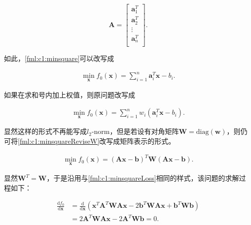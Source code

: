 \begin{equation}\label{fml:c1:reviseA}
	\mathbf{A} = \left[
	\begin{array}{c}
		 \mathbf{a}^T_1 \\
		 \mathbf{a}^T_2 \\
		 \vdots \\
		 \mathbf{a}^T_n \\
	\end{array}
	\right].
\end{equation}

如此，\eqref{fml:c1:minsquare}可以改写成

\begin{align} \label{fml:c1:minsquareRevise}
	\min\limits_{\mathbf{x}} f_0(\mathbf{x}) = \sum\limits_{i=1}^{n}{ \mathbf{a}^T_i \mathbf{x} - b_i }.
\end{align}

如果在求和号内加上权值，则原问题改写成

\begin{align} \label{fml:c1:minsquareReviseW}
	\min\limits_{\mathbf{x}} f_0(\mathbf{x}) = \sum\limits_{i=1}^{n}{ w_i \left( \mathbf{a}^T_i \mathbf{x} - b_i \right) }.
\end{align}

显然这样的形式不再能写成$l_2$-norm，但是若设有对角矩阵$\mathbf{W}=\mathrm{diag}(\mathbf{w})$，则仍可将\eqref{fml:c1:minsquareReviseW}改写成矩阵表示的形式。

\begin{problem}[带权的最小平方问题] \label{def:c1:minsquareReviseWM}
	\begin{align} \label{fml:c1:minsquareReviseWM}
		\min\limits_{\mathbf{x}} f_0(\mathbf{x}) = (\mathbf{A}\mathbf{x}-\mathbf{b})^T\mathbf{W}(\mathbf{A}\mathbf{x}-\mathbf{b}).
	\end{align}
\end{problem}

显然$\mathbf{W}^T=\mathbf{W}$，于是沿用与\eqref{fml:c1:minsquareLoss}相同的样式，该问题的求解过程如下：

\begin{equation}\label{fml:c1:minsquareReviseSolve}
	\begin{aligned}
		\frac{\mathrm{d}f_0}{\mathrm{d}\mathbf{x}} &= \frac{\mathrm{d}}{\mathrm{d}\mathbf{x}} \left( \mathbf{x}^{T}\mathbf{A}^{T}\mathbf{W}\mathbf{A}\mathbf{x} - 2\mathbf{b}^{T}\mathbf{W}\mathbf{A}\mathbf{x} + \mathbf{b}^{T}\mathbf{W}\mathbf{b} \right)\\
		&= 2\mathbf{A}^T\mathbf{W}\mathbf{A}\mathbf{x}-2\mathbf{A}^T\mathbf{W}\mathbf{b} = 0.
	\end{aligned}
\end{equation}

